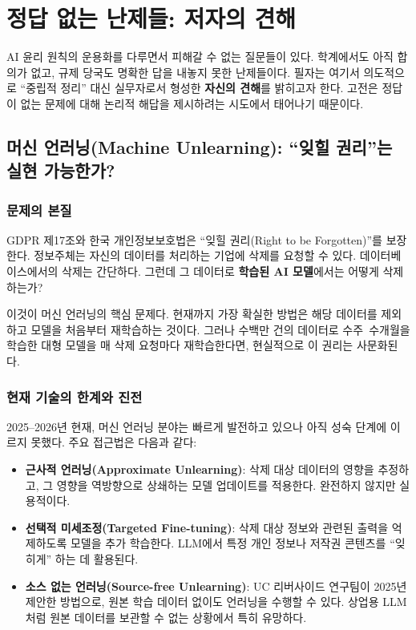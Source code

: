 \section{정답 없는 난제들: 저자의 견해}
\label{sec:3.4}

AI 윤리 원칙의 운용화를 다루면서 피해갈 수 없는 질문들이 있다. 학계에서도 아직 합의가 없고, 규제 당국도 명확한 답을 내놓지 못한 난제들이다. 필자는 여기서 의도적으로 ``중립적 정리'' 대신 실무자로서 형성한 \textbf{자신의 견해}를 밝히고자 한다. 고전은 정답이 없는 문제에 대해 논리적 해답을 제시하려는 시도에서 태어나기 때문이다.

\subsection{머신 언러닝(Machine Unlearning): ``잊힐 권리''는 실현 가능한가?}
\label{sec:3.4.1}

\subsubsection*{문제의 본질}

GDPR 제17조와 한국 개인정보보호법은 ``잊힐 권리(Right to be Forgotten)''를 보장한다. 정보주체는 자신의 데이터를 처리하는 기업에 삭제를 요청할 수 있다. 데이터베이스에서의 삭제는 간단하다. 그런데 그 데이터로 \textbf{학습된 AI 모델}에서는 어떻게 삭제하는가?

이것이 머신 언러닝의 핵심 문제다. 현재까지 가장 확실한 방법은 해당 데이터를 제외하고 모델을 처음부터 재학습하는 것이다. 그러나 수백만 건의 데이터로 수주~수개월을 학습한 대형 모델을 매 삭제 요청마다 재학습한다면, 현실적으로 이 권리는 사문화된다.

\subsubsection*{현재 기술의 한계와 진전}

2025--2026년 현재, 머신 언러닝 분야는 빠르게 발전하고 있으나 아직 성숙 단계에 이르지 못했다\cite{unlearning2026iapp}. 주요 접근법은 다음과 같다:

\begin{itemize}
    \item \textbf{근사적 언러닝(Approximate Unlearning)}: 삭제 대상 데이터의 영향을 추정하고, 그 영향을 역방향으로 상쇄하는 모델 업데이트를 적용한다. 완전하지 않지만 실용적이다.
    \item \textbf{선택적 미세조정(Targeted Fine-tuning)}: 삭제 대상 정보와 관련된 출력을 억제하도록 모델을 추가 학습한다. LLM에서 특정 개인 정보나 저작권 콘텐츠를 ``잊히게'' 하는 데 활용된다.
    \item \textbf{소스 없는 언러닝(Source-free Unlearning)}: UC 리버사이드 연구팀이 2025년 제안한 방법으로, 원본 학습 데이터 없이도 언러닝을 수행할 수 있다. 상업용 LLM처럼 원본 데이터를 보관할 수 없는 상황에서 특히 유망하다.
\end{itemize}

